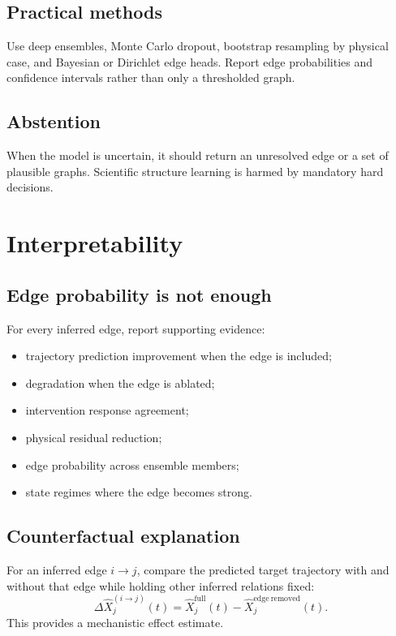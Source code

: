 \documentclass[11pt]{article}
\begin{document}
\subsection{Practical methods}

Use deep ensembles, Monte Carlo dropout, bootstrap resampling by physical case, and Bayesian or Dirichlet edge heads. Report edge probabilities and confidence intervals rather than only a thresholded graph.

\subsection{Abstention}

When the model is uncertain, it should return an unresolved edge or a set of plausible graphs. Scientific structure learning is harmed by mandatory hard decisions.

\section{Interpretability}

\subsection{Edge probability is not enough}

For every inferred edge, report supporting evidence:
\begin{itemize}[leftmargin=1.5em]
    \item trajectory prediction improvement when the edge is included;
    \item degradation when the edge is ablated;
    \item intervention response agreement;
    \item physical residual reduction;
    \item edge probability across ensemble members;
    \item state regimes where the edge becomes strong.
\end{itemize}

\subsection{Counterfactual explanation}

For an inferred edge \(i\rightarrow j\), compare the predicted target trajectory with and without that edge while holding other inferred relations fixed:
\begin{equation}
\Delta\widehat{X}_j^{(i\rightarrow j)}(t)
=\widehat{X}_j^{\mathrm{full}}(t)-\widehat{X}_j^{\mathrm{edge\ removed}}(t).
\end{equation}
This provides a mechanistic effect estimate.
\end{document}
